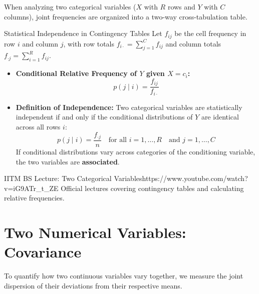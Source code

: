 When analyzing two categorical variables ($X$ with $R$ rows and $Y$ with $C$ columns), joint frequencies are organized into a two-way cross-tabulation table.

\begin{definitionbox}{Statistical Independence in Contingency Tables}
Let $f_{ij}$ be the cell frequency in row $i$ and column $j$, with row totals $f_{i\cdot} = \sum_{j=1}^C f_{ij}$ and column totals $f_{\cdot j} = \sum_{i=1}^R f_{ij}$.
\begin{itemize}
    \item \textbf{Conditional Relative Frequency of $Y$ given $X = c_i$:}
    $$p(j \mid i) = \frac{f_{ij}}{f_{i\cdot}}$$
    \item \textbf{Definition of Independence:} Two categorical variables are statistically independent if and only if the conditional distributions of $Y$ are identical across all rows $i$:
    $$p(j \mid i) = \frac{f_{\cdot j}}{n} \quad \text{for all } i = 1, \dots, R \quad \text{and } j = 1, \dots, C$$
    If conditional distributions vary across categories of the conditioning variable, the two variables are \textbf{associated}.
\end{itemize}
\end{definitionbox}

\begin{videocard}{IITM BS Lecture: Two Categorical Variables}{https://www.youtube.com/watch?v=iG9ATr_t_ZE}
Official lectures covering contingency tables and calculating relative frequencies.
\end{videocard}

\section{Two Numerical Variables: Covariance}

To quantify how two continuous variables vary together, we measure the joint dispersion of their deviations from their respective means.

